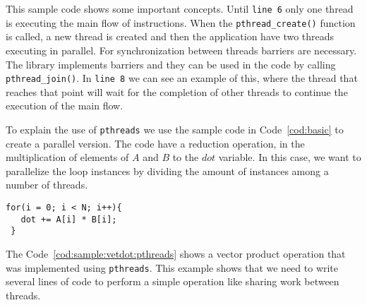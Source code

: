 This sample code shows some important concepts. Until \texttt{line 6} only one thread is executing the main flow of instructions. When the \texttt{pthread\_create()} function is called, a new thread is created and then the application have two threads executing in parallel. For synchronization between threads barriers are necessary. The library implements barriers and they can be used in the code by calling \texttt{pthread\_join()}. In \texttt{line 8} we can see an example of this, where the thread that reaches that point will wait for the completion of other threads to continue the execution of the main flow.

To explain the use of \texttt{pthreads} we use the sample code in Code~\ref{cod:basic} to create a parallel version. The code have a reduction operation, in the multiplication of elements of $A$ and $B$ to the $dot$ variable. In this case, we want to parallelize the loop instances by dividing the amount of instances among a number of threads.

\begin{lstlisting}[style=C, label=cod:basic,caption=Sample of Basic Code.]
 for(i = 0; i < N; i++){
   dot += A[i] * B[i];
 }
\end{lstlisting}

The Code~\ref{cod:sample:vetdot:pthreads} shows a vector product operation that was implemented using \texttt{pthreads}. This example shows that we need to write several lines of code to perform a simple operation like sharing work between threads.

